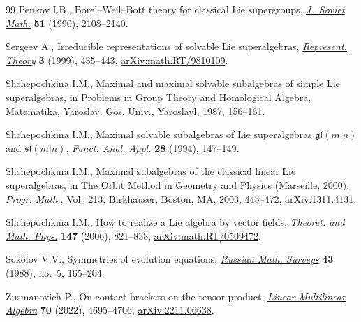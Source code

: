 \documentclass[10pt,a4paper]{amsart}
\newcommand {\<} [2] {{\left.\vphantom{#2}\right.^{#1\!}\!{#2}}}
\numberwithin{equation}{section}
\begin{document}
\begin{thebibliography}{99}
Penkov I.B., Borel--{W}eil--{B}ott theory for classical {L}ie supergroups,
 \href{https://doi.org/10.1007/BF01098186}{\textit{J.~Soviet Math.}}
 \textbf{51} (1990), 2108--2140.

Sergeev A., Irreducible representations of solvable {L}ie superalgebras,
 \href{https://doi.org/10.1090/S1088-4165-99-00086-2}{\textit{Represent.
 Theory}} \textbf{3} (1999), 435--443,
 \href{http://arxiv.org/abs/math.RT/9810109}{arXiv:math.RT/9810109}.

Shchepochkina I.M., Maximal and maximal solvable subalgebras of simple {L}ie
 superalgebras, in Problems in Group Theory and Homological Algebra,
 Matematika, Yaroslav. Gos. Univ., Yaroslavl, 1987, 156--161.

Shchepochkina I.M., Maximal solvable subalgebras of {L}ie superalgebras
 {$\mathfrak{gl}(m|n)$} and {$\mathfrak{sl}(m|n)$},
 \href{https://doi.org/10.1007/BF01076514}{\textit{Funct. Anal. Appl.}}
 \textbf{28} (1994), 147--149.

Shchepochkina I.M., Maximal subalgebras of the classical linear {L}ie
 superalgebras, in The Orbit Method in Geometry and Physics ({M}arseille,
 2000), \textit{Progr. Math.}, Vol.~213, Birkh\"auser, Boston, MA, 2003,
 445--472, \href{http://arxiv.org/abs/1311.4131}{arXiv:1311.4131}.

Shchepochkina I.M., How to realize a {L}ie algebra by vector fields,
 \href{https://doi.org/10.1007/s11232-006-0078-5}{\textit{Theoret. and Math. Phys.}} \textbf{147} (2006), 821--838,
 \href{http://arxiv.org/abs/math.RT/0509472}{arXiv:math.RT/0509472}.

Sokolov V.V., Symmetries of evolution equations,
 \href{https://doi.org/10.1070/RM1988v043n05ABEH001927}{\textit{Russian Math.
 Surveys}} \textbf{43} (1988), no.~5, 165--204.

Zusmanovich P., On contact brackets on the tensor product,
 \href{https://doi.org/10.1080/03081087.2021.1895049}{\textit{Linear
 Multilinear Algebra}} \textbf{70} (2022), 4695--4706,
 \href{http://arxiv.org/abs/2211.06638}{arXiv:2211.06638}.

\end{thebibliography}
\end{document}
